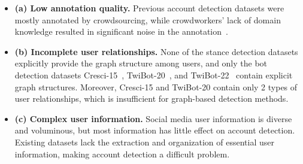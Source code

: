 \documentclass[10pt,twocolumn,letterpaper]{article}
\begin{document}
\begin{itemize}
\vspace{-0.2cm}
\item \textbf{(a) Low annotation quality.} Previous account detection datasets were mostly annotated by crowdsourcing, while crowdworkers' lack of domain knowledge resulted in significant noise in the annotation~\cite{Alpher12}.
\vspace{-0.2cm}
\item \textbf{(b) Incomplete user relationships.} None of the stance detection datasets explicitly provide the graph structure among users, and only the bot detection datasets Cresci-15~\cite{Alpher10}, TwiBot-20~\cite{Alpher11}, and TwiBot-22~\cite{Alpher12} contain explicit graph structures. Moreover, Cresci-15 and TwiBot-20 contain only 2 types of user relationships, which is insufficient for graph-based detection methods.
\vspace{-0.2cm}
\item \textbf{(c) Complex user information.} Social media user information is diverse and voluminous, but most information has little effect on account detection. Existing datasets lack the extraction and organization of essential user information, making account detection a difficult problem.
\end{itemize}
\end{document}
